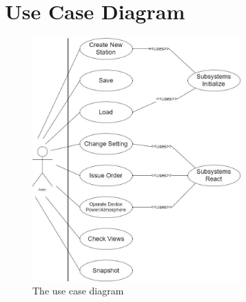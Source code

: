\documentclass[]{article}
\begin{document}
\section{Use Case Diagram}
\label{sec:use_case_diagram}
\begin{figure}[H]
	\centering
	\includegraphics[width=80mm]{use_case_diagram.jpg}
	\caption{The use case diagram}
\end{figure}
\end{document}
